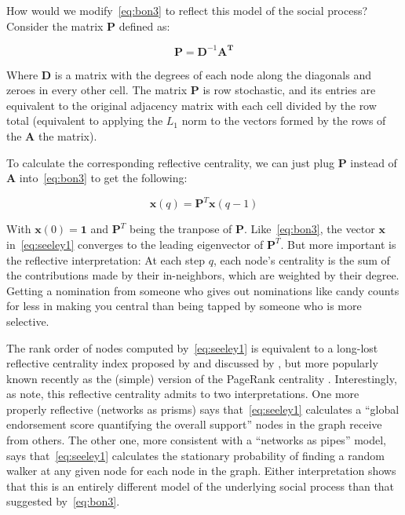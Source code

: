\documentclass[a4paper,fleqn]{cas-sc}
\begin{document}
How would we modify~\ref{eq:bon3} to reflect this model of the social process? Consider the matrix $\mathbf{P}$ defined as:

\begin{equation}
    \mathbf{P} = \mathbf{D}^{-1} \mathbf{A^T}
\end{equation}

Where $\mathbf{D}$ is a matrix with the degrees of each node along the diagonals and zeroes in every other cell. The matrix $\mathbf{P}$ is row stochastic, and its entries are equivalent to the original adjacency matrix with each cell divided by the row total (equivalent to applying the $L_1$ norm to the vectors formed by the rows of the $\mathbf{A}$ the matrix). 

To calculate the corresponding reflective centrality, we can just plug $\mathbf{P}$ instead of $\mathbf{A}$ into~\ref{eq:bon3} to get the following:

\begin{equation}
    \mathbf{x}(q) = \mathbf{P}^T \mathbf{x}(q - 1)
    \label{eq:seeley1}
\end{equation}

With $\mathbf{x}(0) = \mathbf{1}$ and $\mathbf{P}^T$ being the tranpose of $\mathbf{P}$. Like~\ref{eq:bon3}, the vector $\mathbf{x}$ in~\ref{eq:seeley1} converges to the leading eigenvector of $\mathbf{P}^T$. But more important is the reflective interpretation: At each step $q$, each node's centrality is the sum of the contributions made by their in-neighbors, which are weighted by their degree. Getting a nomination from someone who gives out nominations like candy counts for less in making you central than being tapped by someone who is more selective. 

The rank order of nodes computed by~\ref{eq:seeley1} is equivalent to a long-lost reflective centrality index proposed by \citet{seeley49} and discussed by \citet{vigna16}, but more popularly known recently as the (simple) version of the PageRank centrality \citep{brinn_page}. Interestingly, as \citet[218]{fouss_etal16} note, this reflective centrality admits to two interpretations. One more properly reflective (networks as prisms) says that~\ref{eq:seeley1} calculates a ``global endorsement score quantifying the overall support'' nodes in the graph receive from others. The other one, more consistent with a ``networks as pipes'' model, says that~\ref{eq:seeley1} calculates the stationary probability of finding a random walker at any given node for each node in the graph. Either interpretation shows that this is an entirely different model of the underlying social process than that suggested by~\ref{eq:bon3}.
\end{document}
